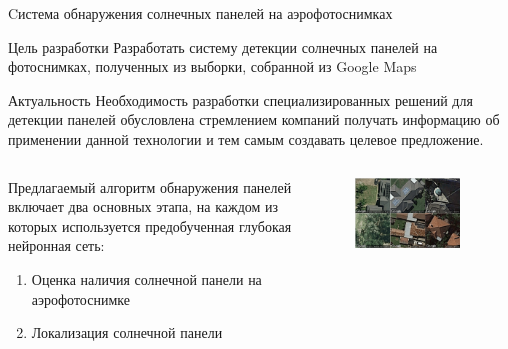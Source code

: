 \documentclass[10pt]{beamer}
\begin{document}
        \begin{frame}{Cистема обнаружения солнечных панелей на аэрофотоснимках}
            \small
            \begin{block}{Цель разработки}
                Разработать систему детекции солнечных панелей на фотоснимках, полученных из выборки, собранной из Google Maps
            \end{block}
            \begin{block}{Актуальность}
                Необходимость разработки специализированных решений для детекции панелей обусловлена стремлением компаний получать информацию об применении данной технологии и тем самым создавать целевое предложение.
            \end{block}
            
            \begin{columns}
                \begin{column}{0.5\textwidth}
                    Предлагаемый алгоритм обнаружения панелей включает два основных этапа, на каждом из которых используется предобученная глубокая нейронная сеть: 

                    \begin{enumerate}
                    \item Оценка наличия солнечной панели на аэрофотоснимке
                    \item Локализация солнечной панели
                    \end{enumerate}
                \end{column}
                \begin{column}{0.5\textwidth}
                    \begin{figure}
                        \centering
                        \includegraphics[width=0.9\textwidth]{pic4-17.png}
                    \end{figure}
                \end{column}
            \end{columns}
        \end{frame}
\end{document}
